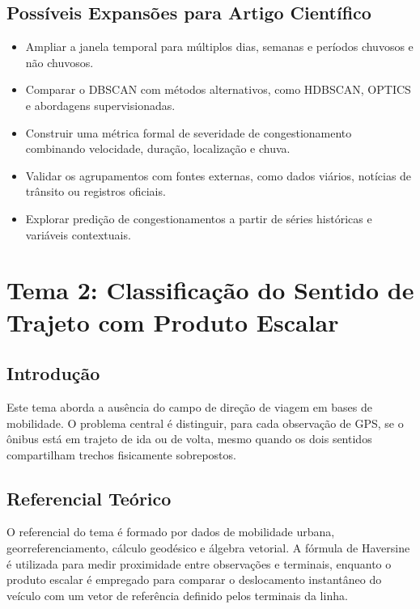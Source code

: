 \documentclass[runningheads]{llncs}
\begin{document}
\subsection{Possíveis Expansões para Artigo Científico}
\begin{itemize}[leftmargin=*]
\item Ampliar a janela temporal para múltiplos dias, semanas e períodos chuvosos e não chuvosos.
\item Comparar o DBSCAN com métodos alternativos, como HDBSCAN, OPTICS e abordagens supervisionadas.
\item Construir uma métrica formal de severidade de congestionamento combinando velocidade, duração, localização e chuva.
\item Validar os agrupamentos com fontes externas, como dados viários, notícias de trânsito ou registros oficiais.
\item Explorar predição de congestionamentos a partir de séries históricas e variáveis contextuais.
\end{itemize}

\section{Tema 2: Classificação do Sentido de Trajeto com Produto Escalar}

\subsection{Introdução}
Este tema aborda a ausência do campo de direção de viagem em bases de mobilidade. O problema central é distinguir, para cada observação de GPS, se o ônibus está em trajeto de ida ou de volta, mesmo quando os dois sentidos compartilham trechos fisicamente sobrepostos.

\subsection{Referencial Teórico}
O referencial do tema é formado por dados de mobilidade urbana, georreferenciamento, cálculo geodésico e álgebra vetorial. A fórmula de Haversine é utilizada para medir proximidade entre observações e terminais, enquanto o produto escalar é empregado para comparar o deslocamento instantâneo do veículo com um vetor de referência definido pelos terminais da linha.
\end{document}
